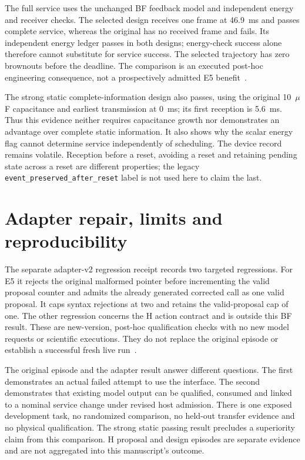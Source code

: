 The full service uses the unchanged BF feedback model and independent energy
and receiver checks. The selected design receives one frame at 46.9~ms and
passes complete service, whereas the original has no received frame and
fails. Its independent energy ledger passes in both designs; energy-check
success alone therefore cannot substitute for service success. The selected
trajectory has zero brownouts before the deadline. The comparison is an
executed post-hoc engineering consequence, not a prospectively admitted E5
benefit~\cite{service}.

The strong static complete-information design also passes, using the original
10~$\mu$F capacitance and earliest transmission at 0~ms; its first reception is
5.6~ms. Thus this evidence neither requires capacitance growth nor demonstrates
an advantage over complete static information. It also shows why the scalar
energy flag cannot determine service independently of scheduling. The device
record remains volatile. Reception before a reset, avoiding a reset and
retaining pending state across a reset are different properties; the legacy
\texttt{event\_preserved\_after\_reset} label is not used here to claim the last.

\section{Adapter repair, limits and reproducibility}
The separate adapter-v2 regression receipt records two targeted regressions.
For E5 it rejects the original malformed pointer before incrementing the valid
proposal counter and admits the already generated corrected call as one valid
proposal. It caps syntax rejections at two and retains the valid-proposal cap
of one. The other regression concerns the H action contract and is outside
this BF result. These are new-version, post-hoc qualification checks with no
new model requests or scientific executions. They do not replace the original
episode or establish a successful fresh live run~\cite{adapter}.

The original episode and the adapter result answer different questions. The
first demonstrates an actual failed attempt to use the interface. The second
demonstrates that existing model output can be qualified, consumed and linked
to a nominal service change under revised host admission. There is one exposed
development task, no randomized comparison, no held-out transfer evidence and
no physical qualification. The strong static passing result precludes a
superiority claim from this comparison. H proposal and design episodes are
separate evidence and are not aggregated into this manuscript's outcome.

